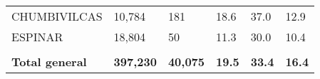 \begin{tabular}{llllll}
	\cellcolor[HTML]{F8CBAD}CHUMBIVILCAS                           & 10,784                                                                & 181                                                              & 18.6                                                                             & 37.0                                                                        & 12.9                                                                                \\
	\cellcolor[HTML]{F8CBAD}ESPINAR                                & 18,804                                                                & 50                                                               & 11.3                                                                             & 30.0                                                                        & 10.4                                                                                \\
	&                                                                       &                                                                  &                                                                                  &                                                                             &                                                                                     \\
	\rowcolor[HTML]{DDEBF7} 
	\textbf{Total   general}                                       & \textbf{397,230}                                                      & \textbf{40,075}                                                  & \textbf{19.5}                                                                    & \textbf{33.4}                                                               & \textbf{16.4}                                                                      
\end{tabular}